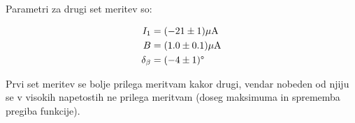 \documentclass[12pt]{report}
\begin{document}
Parametri za drugi set meritev so: 

\begin{align*}
  I_{1} &= (-21 \pm 1)\si{\mu A} \\
  B &= (1.0 \pm 0.1)\si{\mu A}  \\
  \delta_{\beta} &= (-4 \pm 1)\degree
\end{align*}

Prvi set meritev se bolje prilega meritvam kakor drugi, vendar nobeden od njiju se v visokih napetostih ne prilega meritvam (doseg maksimuma in sprememba pregiba funkcije).
\end{document}
